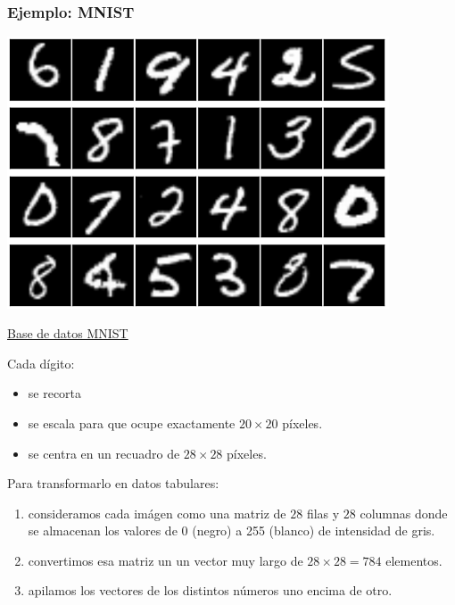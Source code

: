 \documentclass{beamer}
\begin{document}
\begin{frame}[allowframebreaks]
\frametitle{Ejemplo: MNIST}
\begin{center}
\includegraphics[width=0.85\textwidth]{mnist.png}

{\footnotesize \href{http://yann.lecun.com/exdb/mnist/}{Base de datos MNIST}}
\end{center}

Cada dígito:
\begin{itemize}
\item se recorta
\item se escala para que ocupe exactamente $20 \times 20$ píxeles.
\item se centra en un recuadro de $28 \times 28$ píxeles.
\end{itemize}
Para transformarlo en datos tabulares:
\begin{enumerate}
\item consideramos cada imágen como una matriz de $28$ filas y $28$ columnas donde se almacenan los valores de 0 (negro) a 255 (blanco) de intensidad de gris.
\item convertimos esa matriz un un vector muy largo de $28\times 28=784$ elementos.
\item apilamos los vectores de los distintos números uno encima de otro.
\end{enumerate}
\end{frame}
%
%
%
%
\end{document}
